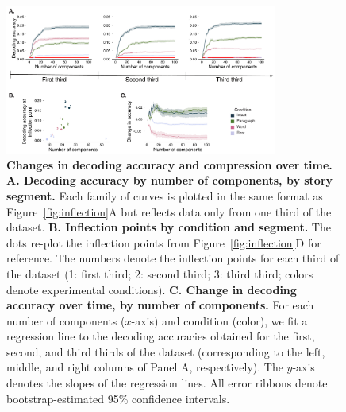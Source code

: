 \documentclass[english, 11pt]{article}
\begin{document}
\begin{figure}[tp]
  \centering
  \includegraphics[width=0.8\textwidth]{figs/information_and_compression_over_time}

\caption{\textbf{Changes in decoding accuracy and compression over time.}
\textbf{A. Decoding accuracy by number of components, by story segment.} Each
family of curves is plotted in the same format as Figure~\ref{fig:inflection}A
but reflects data only from one third of the dataset. \textbf{B. Inflection
points by condition and segment.} The dots re-plot the inflection points from
Figure~\ref{fig:inflection}D for reference. The numbers denote the inflection
points for each third of the dataset (1: first third; 2: second third; 3: third
third; colors denote experimental conditions). \textbf{C. Change in decoding
accuracy over time, by number of components.} For each number of components
($x$-axis) and condition (color), we fit a regression line to the decoding
accuracies obtained for the first, second, and third thirds of the dataset
(corresponding to the left, middle, and right columns of Panel A,
respectively). The $y$-axis denotes the slopes of the regression lines. All
error ribbons denote bootstrap-estimated 95\% confidence intervals.}

\label{fig:inflection-thirds}

\end{figure}
\end{document}
